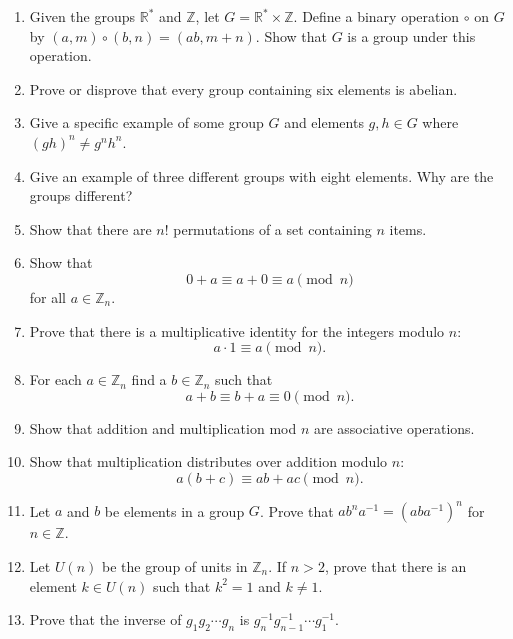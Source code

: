 {\begin{enumerate}
 
\item
Given the groups  ${\mathbb R}^{\ast}$ and ${\mathbb Z}$, let $G = {\mathbb
R}^{\ast}  \times {\mathbb Z}$. Define a binary operation $\circ$ on $G$
by $(a,m) \circ (b,n) = (ab, m+n)$. Show that $G$ is a group under
this operation. 
 
 
\item
Prove or disprove that every group containing six elements is abelian.
 
 
\item
Give a specific example of some group $G$ and elements $g, h \in G$
where $(gh)^n \neq g^nh^n$. 
 
 
\item %
Give an example of three different groups with eight elements.  Why
are the groups different? 
 
 
\item
Show that there are $n!$ permutations of a set containing $n$ items. 
 
 
\item
Show that 
\[
0 + a  \equiv a + 0  \equiv a \pmod{ n }
\]
for all $a \in {\mathbb Z}_n$.
 
 
\item
Prove that there is  a multiplicative identity for the integers modulo
$n$: 
\[
a \cdot  1   \equiv  a \pmod{ n}.
\]
 
 
\item
For each $a \in {\mathbb Z}_n$ find a $b \in {\mathbb Z}_n$ such that
\[
a+b \equiv b+a  \equiv 0 \pmod{ n}.
\]
 
 
\item
Show that addition and multiplication mod $n$ are associative
operations. 
 
 
\item
Show that multiplication distributes over addition modulo $n$:
\[
a  (b  + c)  \equiv a  b + a  c  \pmod{ n}.
\]
 
 
\item
Let $a$ and $b$ be elements in a group $G$.  Prove that $ab^na^{-1} =
(aba^{-1})^n$ for $n \in \mathbb Z$. 
 
 
\item
Let $U(n)$ be the group of units in ${\mathbb Z}_n$. If $n>2$, prove that
there is an element $k \in U(n)$ such that $k^2 = 1$ and $k \neq 1$.
 
 
\item
Prove that the inverse of $g _1 g_2 \cdots g_n$ is $g_n^{-1}
g_{n-1}^{-1} \cdots g_1^{-1}$. 
 

\end{enumerate}}
